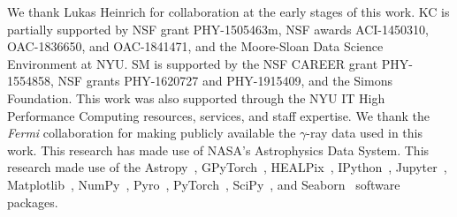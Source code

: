 \documentclass[]{article}
\begin{document}
\begin{ack}
 We thank Lukas Heinrich for collaboration at the early stages of this work. KC is partially supported by NSF grant PHY-1505463m, NSF awards ACI-1450310, OAC-1836650, and OAC-1841471, and the Moore-Sloan Data Science Environment at NYU. SM is supported by the NSF CAREER grant PHY-1554858, NSF grants PHY-1620727 and PHY-1915409, and the Simons Foundation. This work was also supported through the NYU IT High Performance Computing resources, services, and staff expertise. 
We thank the \emph{Fermi} collaboration for making publicly available the $\gamma$-ray data used in this work. This research has made use of NASA's Astrophysics Data System. This research made use of the Astropy~\cite{Robitaille:2013mpa,Price-Whelan:2018hus},
GPyTorch~\cite{gardner2018gpytorch},
HEALPix~\cite{Gorski:2004by,Zonca2019},
IPython~\cite{PER-GRA:2007},
Jupyter~\cite{Kluyver2016JupyterN},
Matplotlib~\cite{Hunter:2007},
NumPy~\cite{harris_array_2020},
Pyro~\cite{bingham2019pyro},
PyTorch~\cite{NEURIPS2019_9015},
SciPy~\cite{2020SciPy-NMeth}, and
Seaborn~\cite{michael_waskom_2017_883859}
software packages.
\end{ack}





\end{document}
